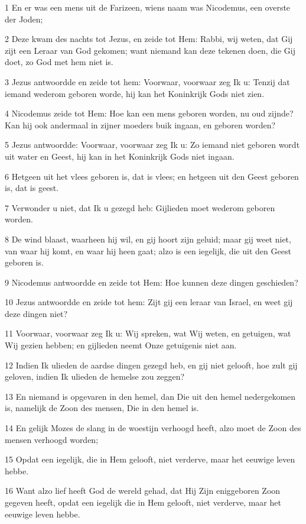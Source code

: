 \par 1 En er was een mens uit de Farizeen, wiens naam was Nicodemus, een overste der Joden;
\par 2 Deze kwam des nachts tot Jezus, en zeide tot Hem: Rabbi, wij weten, dat Gij zijt een Leraar van God gekomen; want niemand kan deze tekenen doen, die Gij doet, zo God met hem niet is.
\par 3 Jezus antwoordde en zeide tot hem: Voorwaar, voorwaar zeg Ik u: Tenzij dat iemand wederom geboren worde, hij kan het Koninkrijk Gods niet zien.
\par 4 Nicodemus zeide tot Hem: Hoe kan een mens geboren worden, nu oud zijnde? Kan hij ook andermaal in zijner moeders buik ingaan, en geboren worden?
\par 5 Jezus antwoordde: Voorwaar, voorwaar zeg Ik u: Zo iemand niet geboren wordt uit water en Geest, hij kan in het Koninkrijk Gods niet ingaan.
\par 6 Hetgeen uit het vlees geboren is, dat is vlees; en hetgeen uit den Geest geboren is, dat is geest.
\par 7 Verwonder u niet, dat Ik u gezegd heb: Gijlieden moet wederom geboren worden.
\par 8 De wind blaast, waarheen hij wil, en gij hoort zijn geluid; maar gij weet niet, van waar hij komt, en waar hij heen gaat; alzo is een iegelijk, die uit den Geest geboren is.
\par 9 Nicodemus antwoordde en zeide tot Hem: Hoe kunnen deze dingen geschieden?
\par 10 Jezus antwoordde en zeide tot hem: Zijt gij een leraar van Israel, en weet gij deze dingen niet?
\par 11 Voorwaar, voorwaar zeg Ik u: Wij spreken, wat Wij weten, en getuigen, wat Wij gezien hebben; en gijlieden neemt Onze getuigenis niet aan.
\par 12 Indien Ik ulieden de aardse dingen gezegd heb, en gij niet gelooft, hoe zult gij geloven, indien Ik ulieden de hemelse zou zeggen?
\par 13 En niemand is opgevaren in den hemel, dan Die uit den hemel nedergekomen is, namelijk de Zoon des mensen, Die in den hemel is.
\par 14 En gelijk Mozes de slang in de woestijn verhoogd heeft, alzo moet de Zoon des mensen verhoogd worden;
\par 15 Opdat een iegelijk, die in Hem gelooft, niet verderve, maar het eeuwige leven hebbe.
\par 16 Want alzo lief heeft God de wereld gehad, dat Hij Zijn eniggeboren Zoon gegeven heeft, opdat een iegelijk die in Hem gelooft, niet verderve, maar het eeuwige leven hebbe.
